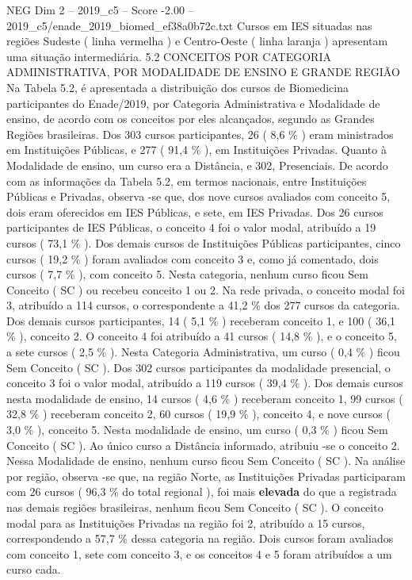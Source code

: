 \begin{textsample}{NEG Dim 2 – 2019\_c5 – Score -2.00 – 2019\_c5/enade\_2019\_biomed\_ef38a0b72c.txt}
Cursos em IES situadas nas regiões Sudeste ( linha vermelha ) e Centro-Oeste ( linha laranja ) apresentam uma situação intermediária. 5.2 CONCEITOS POR CATEGORIA ADMINISTRATIVA, POR MODALIDADE DE ENSINO E GRANDE REGIÃO Na Tabela 5.2, é apresentada a distribuição dos cursos de Biomedicina participantes do Enade/2019, por Categoria Administrativa e Modalidade de ensino, de acordo com os conceitos por eles alcançados, segundo as Grandes Regiões brasileiras.
Dos 303 cursos participantes, 26 ( 8,6 \% ) eram ministrados em Instituições Públicas, e 277 ( 91,4 \% ), em Instituições Privadas.
Quanto à Modalidade de ensino, um curso era a Distância, e 302, Presenciais.
De acordo com as informações da Tabela 5.2, em termos nacionais, entre Instituições Públicas e Privadas, observa -se que, dos nove cursos avaliados com conceito 5, dois eram oferecidos em IES Públicas, e sete, em IES Privadas.
Dos 26 cursos participantes de IES Públicas, o conceito 4 foi o valor modal, atribuído a 19 cursos ( 73,1 \% ).
Dos demais cursos de Instituições Públicas participantes, cinco cursos ( 19,2 \% ) foram avaliados com conceito 3 e, como já comentado, dois cursos ( 7,7 \% ), com conceito 5.
Nesta categoria, nenhum curso ficou Sem Conceito ( SC ) ou recebeu conceito 1 ou 2.
Na rede privada, o conceito modal foi 3, atribuído a 114 cursos, o correspondente a 41,2 \% dos 277 cursos da categoria.
Dos demais cursos participantes, 14 ( 5,1 \% ) receberam conceito 1, e 100 ( 36,1 \% ), conceito 2.
O conceito 4 foi atribuído a 41 cursos ( 14,8 \% ), e o conceito 5, a sete cursos ( 2,5 \% ).
Nesta Categoria Administrativa, um curso ( 0,4 \% ) ficou Sem Conceito ( SC ).
Dos 302 cursos participantes da modalidade presencial, o conceito 3 foi o valor modal, atribuído a 119 cursos ( 39,4 \% ).
Dos demais cursos nesta modalidade de ensino, 14 cursos ( 4,6 \% ) receberam conceito 1, 99 cursos ( 32,8 \% ) receberam conceito 2, 60 cursos ( 19,9 \% ), conceito 4, e nove cursos ( 3,0 \% ), conceito 5.
Nesta modalidade de ensino, um curso ( 0,3 \% ) ficou Sem Conceito ( SC ).
Ao único curso a Distância informado, atribuiu -se o conceito 2.
Nessa Modalidade de ensino, nenhum curso ficou Sem Conceito ( SC ).
Na análise por região, observa -se que, na região Norte, as Instituições Privadas participaram com 26 cursos ( 96,3 \% do total regional ), foi mais \textbf{elevada} do que a registrada nas demais regiões brasileiras, nenhum ficou Sem Conceito ( SC ).
O conceito modal para as Instituições Privadas na região foi 2, atribuído a 15 cursos, correspondendo a 57,7 \% dessa categoria na região.
Dois cursos foram avaliados com conceito 1, sete com conceito 3, e os conceitos 4 e 5 foram atribuídos a um curso cada.

\end{textsample}
